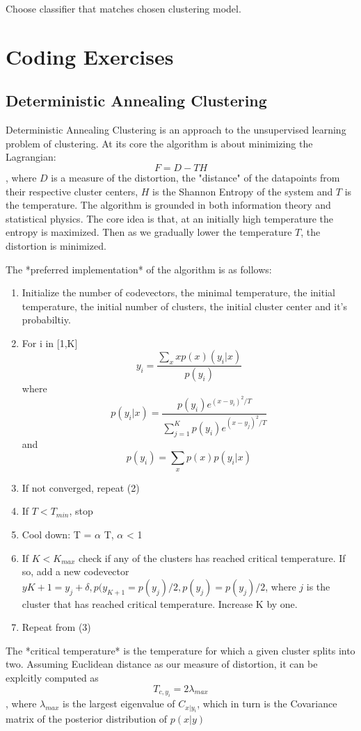 \documentclass[9pt,parskip]{scrartcl}
\begin{document}
\begin{multicols*}{4}
Choose classifier that matches chosen clustering model. 

\section*{Coding Exercises}
\subsection*{Deterministic Annealing Clustering}
Deterministic Annealing Clustering is an approach to the unsupervised learning problem of clustering. At its core the algorithm is about minimizing the Lagrangian: $$F = D - TH$$
, where $D$ is a measure of the distortion, the "distance" of the datapoints from their respective cluster centers, $H$ is the Shannon Entropy of the system and $T$ is the temperature. The algorithm is grounded in both information theory and statistical physics. The core idea is that, at an initially high temperature the entropy is maximized. Then as we gradually lower the temperature $T$, the distortion is minimized. 

The *preferred implementation* of the algorithm is as follows:
\begin{enumerate}
    \item Initialize the number of codevectors, the minimal temperature, the initial temperature, the initial number of clusters, the initial cluster center and it's probabiltiy. 
\item For i in [1,K] $$y_i = \frac{\sum_x x p(x)(y_i|x)}{p(y_i)}$$ 
    where $$p(y_i|x) = \frac{p(y_i)e^{(x-y_i)^2/T}}{\sum_{j=1}^Kp(y_i)e^{(x-y_j)^2/T}}$$
    and $$p(y_i) = \sum_xp(x)p(y_i|x)$$
\item If not converged, repeat (2)
\item If $T < T_{min}$, stop
\item Cool down: T = $\alpha$ T, $\alpha$ < 1
\item If $K < K_{max}$ check if any of the clusters has reached critical temperature. If so, add a new codevector $y{K+1} = y_j + \delta, p(y_{K+1} = p(y_j)/2, p(y_j) = p(y_j)/2$, where $j$ is the cluster that has reached critical temperature. Increase K by one. 
\item Repeat from (3)
\end{enumerate}


The *critical temperature* is the temperature for which a given cluster splits into two. Assuming Euclidean distance as our measure of distortion, it can be explcitly computed as $$T_{c,y_i} = 2\lambda_{max}$$, where $\lambda_{max}$ is the largest eigenvalue of $C_{x|y_i}$, which in turn is the Covariance matrix of the posterior distribution of $p(x|y)$

\end{multicols*}
\end{document}
